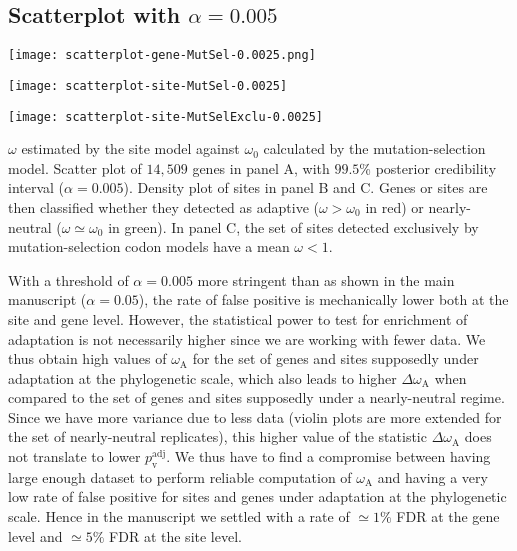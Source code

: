 \documentclass{article}
\renewcommand*{\bm}[1]{#1}%
\newcommand{\rateApop}{\omega_{\mathrm{A}}}
\begin{document}
    \subsection{Scatterplot with $\bm{\alpha=0.005}$}

    \begin{center}
        \begin{minipage}{0.32\linewidth}
            \texttt{[image: scatterplot-gene-MutSel-0.0025.png]}
        \end{minipage}
        \hfill
        \begin{minipage}{0.32\linewidth}
            \texttt{[image: scatterplot-site-MutSel-0.0025]}
        \end{minipage}
        \hfill
        \begin{minipage}{0.32\linewidth}
            \texttt{[image: scatterplot-site-MutSelExclu-0.0025]}
        \end{minipage}
        \hfill
    \end{center}

    $\omega$ estimated by the site model against $\omega_{0}$ calculated by the mutation-selection model.
    Scatter plot of $14,509$ genes in panel A, with $99.5$\% posterior credibility interval ($\alpha=0.005$).
    Density plot of sites in panel B and C.
    Genes or sites are then classified whether they detected as adaptive ($\omega > \omega_{0}$ in red) or nearly-neutral ($\omega \simeq \omega_{0}$ in green).
    In panel C, the set of sites detected exclusively by mutation-selection codon models have a mean $\omega < 1 $.

    \newpage
    

    With a threshold of $\alpha=0.005$ more stringent than as shown in the main manuscript ($\alpha=0.05$), the rate of false positive is mechanically lower both at the site and gene level.
    However, the statistical power to test for enrichment of adaptation is not necessarily higher since we are working with fewer data.
    We thus obtain high values of $\rateApop$ for the set of genes and sites supposedly under adaptation at the phylogenetic scale, which also leads to higher $\Delta \rateApop$ when compared to the set of genes and sites supposedly under a nearly-neutral regime.
    Since we have more variance due to less data (violin plots are more extended for the set of nearly-neutral replicates), this higher value of the statistic $\Delta \rateApop$
    does not translate to lower $p_{\mathrm{v}}^{\mathrm{adj}}$.
    We thus have to find a compromise between having large enough dataset to perform reliable computation of $\rateApop$ and having a very low rate of false positive for sites and genes under adaptation at the phylogenetic scale.
    Hence in the manuscript we settled with a rate of $\simeq 1 \%$ FDR at the gene level and $\simeq 5 \%$ FDR at the site level.
\end{document}
